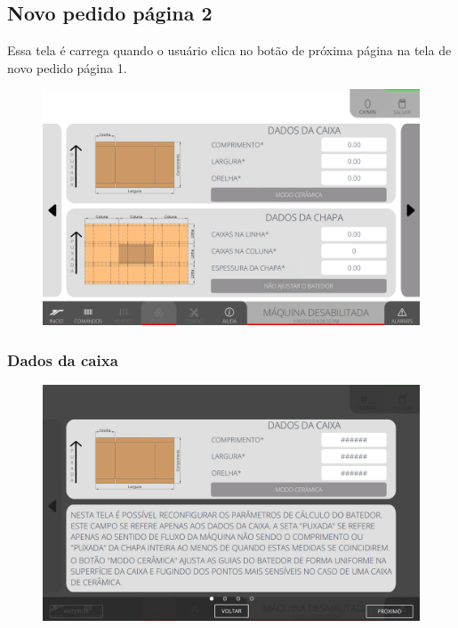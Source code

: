\newpage
\thispagestyle{fancy}
\vspace*{40 pt}
\subsection{Novo pedido página 2} \label{sec:telaNovoPedidoP2}
Essa tela é carrega quando o usuário clica no botão de próxima página na tela de novo pedido página 1.
\vspace*{\fill}
\begin{figure}[h]
    \centering
    \includegraphics[width=480 px,height=300 px]{src/imagesICV/09-request/new/Tela-Principal-2.png}
\end{figure}
\vspace*{\fill}

\newpage
\thispagestyle{fancy}
\vspace*{40 pt}
\subsubsection{\small{Dados da caixa}} \label{sec:telaNovoPedidoP2DadosCaixa}
\vspace*{\fill}
\begin{figure}[h]
    \centering
    \includegraphics[width=576 px,height=360 px]{src/imagesICV/09-request/new/e-6.png}
\end{figure}
\vspace*{\fill}

